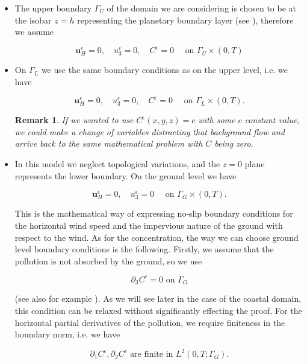 \documentclass[11pt]{article}
\newtheorem{remark}{Remark}
\begin{document}
  \begin{itemize}
  
    \item The upper boundary $\Gamma_U$ of the domain we are considering is chosen to be at the isobar $z=h$ representing the planetary boundary layer (see \cite{arya2001introduction}), therefore we assume
    
    \begin{equation}
      \mathbf{u}^\epsilon_H = 0, \quad u^\epsilon_3 = 0, \quad C^\epsilon = 0 \quad \text{ on } \Gamma_U \times (0,T)
    \end{equation}
      
    \item On $\Gamma_L$ we use the same boundary conditions as on the upper level, i.e. we have
    
    \begin{equation}
      \mathbf{u}^\epsilon_H = 0, \quad u^\epsilon_3 = 0, \quad C^\epsilon = 0  \quad \text{ on } \Gamma_L \times (0,T).
    \end{equation}
    
    
    \begin{remark}
    If we wanted to use $C^\epsilon(x,y,z) = c$ with some $c$ constant value, we could make a change of variables distracting that background flow and arrive back to the same mathematical problem with $C$ being zero.
    \end{remark}
    \item In this model we neglect topological variations, and the $z=0$ plane represents the lower boundary. On the ground level we have
    
    \begin{equation}
      \mathbf{u}^\epsilon_H = 0, \quad u^\epsilon_3 = 0 \quad \text{ on } \Gamma_G \times (0,T) .
    \end{equation}
    
    This is the mathematical way of expressing no-slip boundary conditions for the horizontal wind speed and the impervious nature of the ground with respect to the wind. As for the concentration, the way we can choose ground level boundary conditions is the following. Firstly, we assume that the pollution is not absorbed by the ground, so we use
    
    $$\partial_3 C^\epsilon = 0 \text{ on } \Gamma_G$$
    
    (see also for example \cite{yeh1975three}). As we will see later in the case of the coastal domain, this condition can be relaxed without significantly effecting the proof. For the horizontal partial derivatives of the pollution, we require finiteness in the boundary norm, i.e. we have
    
    $$\partial_1 C^\epsilon, \partial_2 C^\epsilon \text{ are finite in } L^2 (0,T; \Gamma_G).$$
  
  \end{itemize}
\end{document}
